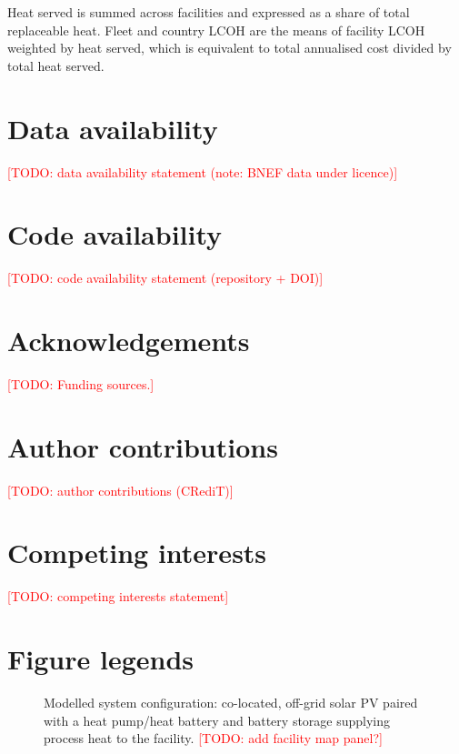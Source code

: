 \documentclass[11pt]{article}
\newcommand{\todo}[1]{\textcolor{red}{[TODO: #1]}}
\begin{document}
Heat served is summed across facilities and expressed as a share of total replaceable heat. Fleet and country LCOH are the means of facility LCOH weighted by heat served, which is equivalent to total annualised cost divided by total heat served.

\section*{Data availability}
\todo{data availability statement (note: BNEF data under licence)}

\section*{Code availability}
\todo{code availability statement (repository + DOI)}




\section*{Acknowledgements}
\todo{Funding sources.}

\section*{Author contributions}
\todo{author contributions (CRediT)}

\section*{Competing interests}
\todo{competing interests statement}

\section*{Figure legends}

\begin{figure}[h]
\centering
\caption{Modelled system configuration: co-located, off-grid solar PV paired with a heat pump/heat battery and battery storage supplying process heat to the facility. \todo{add facility map panel?}}
\label{fig:system}
\end{figure}
\end{document}
